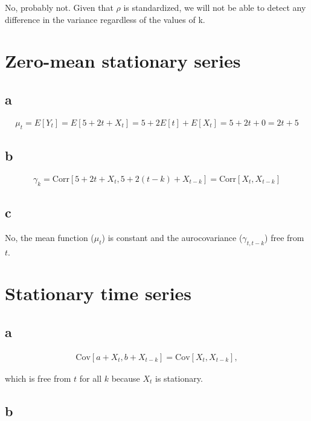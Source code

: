 \documentclass[]{book}
\theoremstyle{definition}
\theoremstyle{definition}
\theoremstyle{remark}
\begin{document}
No, probably not. Given that \(\rho\) is standardized, we will not be
able to detect any difference in the variance regardless of the values
of k.

\section{Zero-mean stationary series}\label{zero-mean-stationary-series}

\subsection*{a}\label{a-3}

\[\mu_t = E[Y_t] = E[5 + 2t + X_t] = 5 + 2E[t] + E[X_t] = 5 + 2t + 0 = 2t + 5\]

\subsection*{b}\label{b-3}

\[ \gamma_k = \text{Corr}[5+2t+X_t, 5+2(t-k)+X_{t-k}] =
  \text{Corr}[X_t, X_{t-k}]\]

\subsection*{c}\label{c-2}

No, the mean function (\(\mu_t\)) is constant and the aurocovariance
(\(\gamma_{t,t-k}\)) free from \(t\).

\section{Stationary time series}\label{stationary-time-series}

\subsection*{a}\label{a-4}

\begin{gather*}\text{Cov}[a + X_t, b + X_{t-k}] =\text{Cov}[X_t, X_{t-k}],\end{gather*}

which is free from \(t\) for all \(k\) because \(X_t\) is stationary.

\subsection*{b}\label{b-4}
\end{document}
